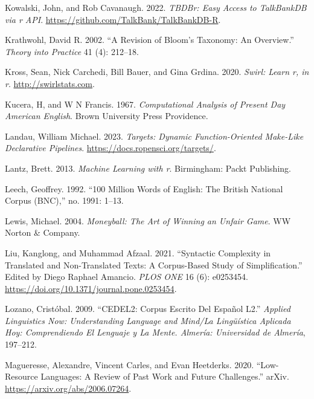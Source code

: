 \documentclass[
  letterpaper,
  DIV=11,
  numbers=noendperiod]{scrreport}
\newlength{\cslhangindent}
\newlength{\cslentryspacingunit} %
\newenvironment{CSLReferences}[2] %
 {%
  \setlength{\parindent}{0pt}
  \ifodd #1
  \let\oldpar\par
  \def\par{\hangindent=\cslhangindent\oldpar}
  \fi
  \setlength{\parskip}{#2\cslentryspacingunit}
 }%
 {}
\theoremstyle{definition}
\theoremstyle{remark}
\begin{document}
\begin{CSLReferences}{1}{0}
\leavevmode{}%
Kowalski, John, and Rob Cavanaugh. 2022. \emph{TBDBr: Easy Access to
TalkBankDB via r API}. \url{https://github.com/TalkBank/TalkBankDB-R}.

\leavevmode{}%
Krathwohl, David R. 2002. {``A Revision of Bloom's Taxonomy: An
Overview.''} \emph{Theory into Practice} 41 (4): 212--18.

\leavevmode{}%
Kross, Sean, Nick Carchedi, Bill Bauer, and Gina Grdina. 2020.
\emph{Swirl: Learn r, in r}. \url{http://swirlstats.com}.

\leavevmode{}%
Kucera, H, and W N Francis. 1967. \emph{Computational Analysis of
Present Day American English}. Brown University Press Providence.

\leavevmode{}%
Landau, William Michael. 2023. \emph{Targets: Dynamic Function-Oriented
Make-Like Declarative Pipelines}.
\url{https://docs.ropensci.org/targets/}.

\leavevmode{}%
Lantz, Brett. 2013. \emph{Machine Learning with r}. Birmingham: Packt
Publishing.

\leavevmode{}%
Leech, Geoffrey. 1992. {``100 Million Words of English: The British
National Corpus (BNC),''} no. 1991: 1--13.

\leavevmode{}%
Lewis, Michael. 2004. \emph{Moneyball: The Art of Winning an Unfair
Game}. WW Norton \& Company.

\leavevmode{}%
Liu, Kanglong, and Muhammad Afzaal. 2021. {``Syntactic Complexity in
Translated and Non-Translated Texts: A Corpus-Based Study of
Simplification.''} Edited by Diego Raphael Amancio. \emph{PLOS ONE} 16
(6): e0253454. \url{https://doi.org/10.1371/journal.pone.0253454}.

\leavevmode{}%
Lozano, Cristóbal. 2009. {``CEDEL2: Corpus Escrito Del Español L2.''}
\emph{Applied Linguistics Now: Understanding Language and Mind/La
Lingüística Aplicada Hoy: Comprendiendo El Lenguaje y La Mente. Almería:
Universidad de Almería}, 197--212.

\leavevmode{}%
Magueresse, Alexandre, Vincent Carles, and Evan Heetderks. 2020.
{``Low-Resource Languages: A Review of Past Work and Future
Challenges.''} arXiv. \url{https://arxiv.org/abs/2006.07264}.


\end{CSLReferences}
\end{document}
